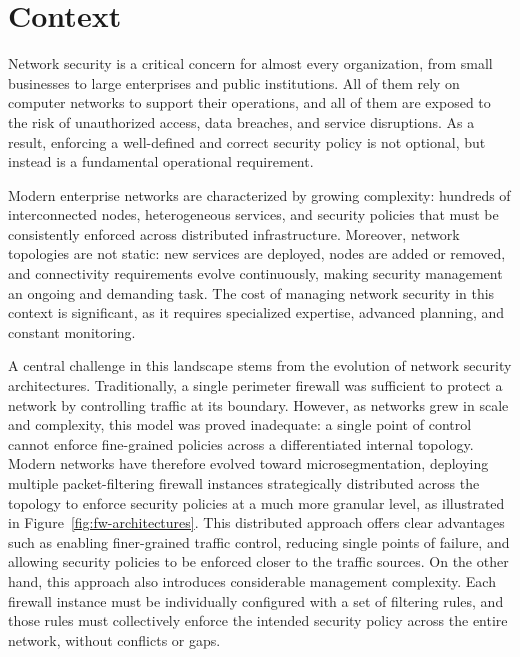 
\section{Context}

Network security is a critical concern for almost every organization, from small businesses to large enterprises and public institutions. All of them rely on computer networks to support their operations, and all of them are exposed to the risk of unauthorized access, data breaches, and service disruptions. As a result, enforcing a well-defined and correct security policy is not optional, but instead is a fundamental operational requirement.

Modern enterprise networks are characterized by growing complexity: hundreds of interconnected nodes, heterogeneous services, and security policies that must be consistently enforced across distributed infrastructure. Moreover, network topologies are not static: new services are deployed, nodes are added or removed, and connectivity requirements evolve continuously, making security management an ongoing and demanding task. The cost of managing network security in this context is significant, as it requires specialized expertise, advanced planning, and constant monitoring. 

A central challenge in this landscape stems from the evolution of network security architectures. Traditionally, a single perimeter firewall was sufficient to protect a network by controlling traffic at its boundary. However, as networks grew in scale and complexity, this model was proved inadequate: a single point of control cannot enforce fine-grained policies across a differentiated internal topology. Modern networks have therefore evolved toward microsegmentation, deploying multiple packet-filtering firewall instances strategically distributed across the topology to enforce security policies at a much more granular level, as illustrated in Figure~\ref{fig:fw-architectures}. This distributed approach offers clear advantages such as enabling finer-grained traffic control, reducing single points of failure, and allowing security policies to be enforced closer to the traffic sources. On the other hand, this approach also introduces considerable management complexity. Each firewall instance must be individually configured with a set of filtering rules, and those rules must collectively enforce the intended security policy across the entire network, without conflicts or gaps.

